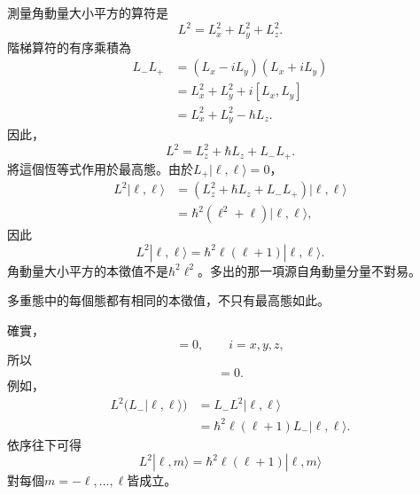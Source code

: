 測量角動量大小平方的算符是
\begin{equation}
L^2=L_x^2+L_y^2+L_z^2.
\end{equation}
階梯算符的有序乘積為
\begin{align}
L_-L_+
&=(L_x-iL_y)(L_x+iL_y) \\
&=L_x^2+L_y^2+i[L_x,L_y] \\
&=L_x^2+L_y^2-\hbar L_z.
\end{align}
因此，
\begin{equation}
L^2=L_z^2+\hbar L_z+L_-L_+.
\end{equation}
將這個恆等式作用於最高態。由於\(L_+|\ell,\ell\rangle=0\)，
\begin{align}
L^2|\ell,\ell\rangle
&=\left(L_z^2+\hbar L_z+L_-L_+\right)|\ell,\ell\rangle \\
&=\hbar^2\left(\ell^2+\ell\right)|\ell,\ell\rangle,
\end{align}
因此
\begin{equation}
L^2|\ell,\ell\rangle
=\hbar^2\ell(\ell+1)|\ell,\ell\rangle.
\end{equation}
角動量大小平方的本徵值不是\(\hbar^2\ell^2\)。多出的那一項源自角動量分量不對易。

多重態中的每個態都有相同的本徵值，不只有最高態如此。

\begin{classroomqa}
\end{classroomqa}

確實，
\begin{equation}
[L^2,L_i]=0,
\qquad i=x,y,z,
\end{equation}
所以
\begin{equation}
[L^2,L_\pm]=0.
\end{equation}
例如，
\begin{align}
L^2\bigl(L_-|\ell,\ell\rangle\bigr)
&=L_-L^2|\ell,\ell\rangle \\
&=\hbar^2\ell(\ell+1)L_-|\ell,\ell\rangle.
\end{align}
依序往下可得
\begin{equation}
L^2|\ell,m\rangle
=\hbar^2\ell(\ell+1)|\ell,m\rangle
\end{equation}
對每個\(m=-\ell,\ldots,\ell\)皆成立。

